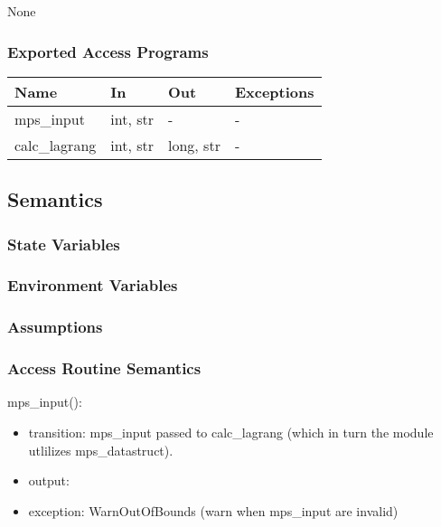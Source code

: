 \documentclass[12pt, titlepage]{article}
\begin{document}
None

\subsubsection{Exported Access Programs}

\begin{center}
\begin{tabular}{p{2cm} p{4cm} p{4cm} p{2cm}}
\hline
\textbf{Name} & \textbf{In} & \textbf{Out} & \textbf{Exceptions} \\
\hline
mps\_input  & int, str & - & - \\
calc\_lagrang & int, str & long, str & - \\
\hline
\end{tabular}
\end{center}

\subsection{Semantics}

\subsubsection{State Variables}

\subsubsection{Environment Variables}


\subsubsection{Assumptions}


\subsubsection{Access Routine Semantics}

\noindent mps\_input():
\begin{itemize}
\item transition: mps\_input passed to calc\_lagrang (which in turn the module utlilizes mps\_datastruct).
\item output:  
\item exception: WarnOutOfBounds (warn when mps\_input are invalid)  
\end{itemize}
\end{document}
